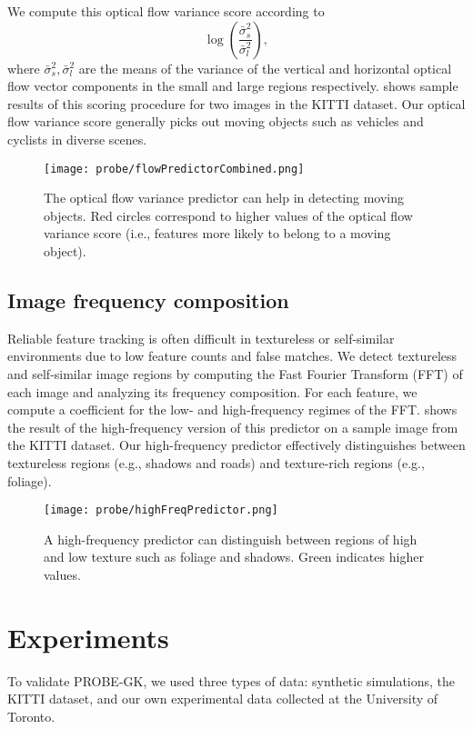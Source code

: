 We compute this optical flow variance score according to
\begin{equation}
    \log \left( \frac{\bar{\sigma}^2_s}{\bar{\sigma}^2_l} \right),
\end{equation}
where $\bar{\sigma}^2_s, \bar{\sigma}^2_l$ are the means of the variance of the vertical and horizontal optical flow vector components in the small and large regions respectively.
 shows sample results of this scoring procedure for two images in the KITTI dataset.
Our optical flow variance score generally picks out moving objects such as vehicles and cyclists in diverse scenes.

\begin{figure}
    \centering
    \texttt{[image: probe/flowPredictorCombined.png]}
    \caption{The optical flow variance predictor can help in detecting moving objects. Red circles correspond to higher values of the optical flow variance score (i.e., features more likely to belong to a moving object).}
    \label{fig:probe_flow_variance}
\end{figure}

\subsection{Image frequency composition}
Reliable feature tracking is often difficult in textureless or self-similar environments due to low feature counts and false matches.
We detect textureless and self-similar image regions by computing the Fast Fourier Transform (FFT) of each image and analyzing its frequency composition.
For each feature, we compute a coefficient for the low- and high-frequency regimes of the FFT.
 shows the result of the high-frequency version of this predictor on a sample image from the KITTI dataset.
Our high-frequency predictor effectively distinguishes between textureless regions (e.g., shadows and roads) and texture-rich regions (e.g., foliage).


\begin{figure}
    \centering
    \texttt{[image: probe/highFreqPredictor.png]}
    \caption{A high-frequency predictor can distinguish between regions of high and low texture such as foliage and shadows. Green indicates higher values.}
    \label{fig:probe_high_frequency}
\end{figure}


\section{Experiments}
To validate PROBE-GK, we used three types of data: synthetic simulations, the
KITTI dataset, and our own experimental data collected at the University of
Toronto. 

